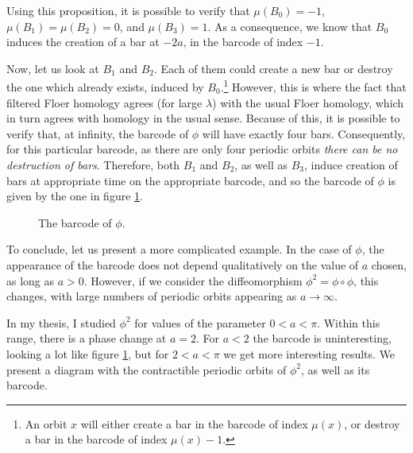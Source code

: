 \documentclass[11pt, a4paper]{article}
\theoremstyle{nonumberplain}
\newcommand{\HF}{\mathrm{HF}}
\begin{document}
Using this proposition, it is possible to verify that $\mu(B_0) = -1$, $\mu(B_1) = \mu(B_2) = 0$, and $\mu(B_3) = 1$. As a consequence, we know that $B_0$ induces the creation of a bar at $-2a$, in the barcode of index $-1$.

Now, let us look at $B_1$ and $B_2$. Each of them could create a new bar or destroy the one which already exists, induced by $B_0$.\footnote{An orbit $x$ will either create a bar in the barcode of index $\mu(x)$, or destroy a bar in the barcode of index $\mu(x)-1$.} However, this is where the fact that filtered Floer homology agrees (for large $\lambda$) with the usual Floer homology, which in turn agrees with homology in the usual sense. Because of this, it is possible to verify that, at infinity, the barcode of $\phi$ will have exactly four bars. Consequently, for this particular barcode, as there are only four periodic orbits \emph{there can be no destruction of bars}. Therefore, both $B_1$ and $B_2$, as well as $B_3$, induce creation of bars at appropriate time on the appropriate barcode, and so the barcode of $\phi$ is given by the one in figure \ref{fig:bc1}.
\begin{figure}[H]
\centering
{}
\caption{The barcode of $\phi$.}\label{fig:bc1}
\end{figure}

To conclude, let us present a more complicated example. In the case of $\phi$, the appearance of the barcode does not depend qualitatively on the value of $a$ chosen, as long as $a > 0$. However, if we consider the diffeomorphism $\phi^2 = \phi \circ \phi$, this changes, with large numbers of periodic orbits appearing as $a \to \infty$.

In my thesis, I studied $\phi^2$ for values of the parameter $0 < a < \pi$. Within this range, there is a phase change at $a = 2$. For $a < 2$ the barcode is uninteresting, looking a lot like figure \ref{fig:bc1}, but for $2 < a < \pi$ we get more interesting results. We present a diagram with the contractible periodic orbits of $\phi^2$, as well as its barcode.
\end{document}
